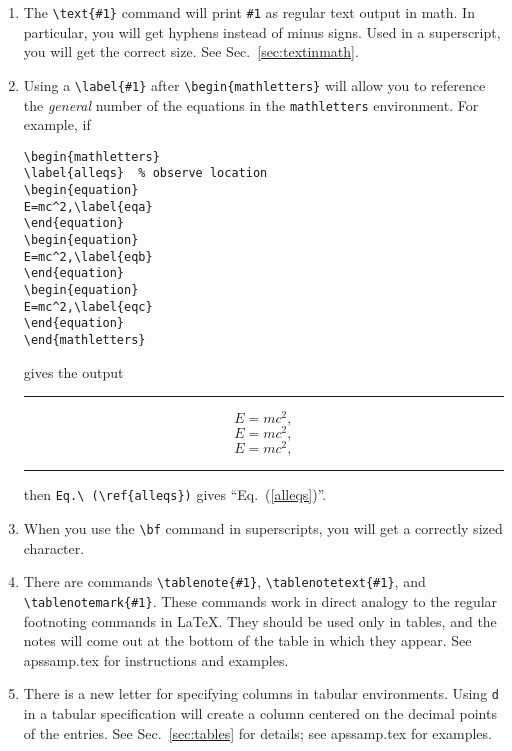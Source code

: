 \begin{enumerate}
\item The \verb+\text{#1}+ command will print \verb+#1+ as regular text
output in math. In particular, you will get hyphens instead of minus signs.
Used in a superscript, you will get the correct size. See Sec.\
\ref{sec:textinmath}.

\item Using a \verb+\label{#1}+ after \verb+\begin{mathletters}+ will allow
you to reference the {\em general\/} number of the equations in the
\verb+mathletters+ environment. For example, if
\begin{verbatim}
\begin{mathletters}
\label{alleqs}  % observe location
\begin{equation}
E=mc^2,\label{eqa}
\end{equation}
\begin{equation}
E=mc^2,\label{eqb}
\end{equation}
\begin{equation}
E=mc^2,\label{eqc}
\end{equation}
\end{mathletters}
\end{verbatim}
gives the output
\smallskip\hrule\smallskip
\begin{mathletters}
\label{alleqs}
\begin{equation}
E=mc^2,\label{eqa}
\end{equation}
\begin{equation}
E=mc^2,\label{eqb}
\end{equation}
\begin{equation}
E=mc^2,\label{eqc}
\end{equation}
\end{mathletters}
\smallskip\hrule\smallskip
then \verb+Eq.\ (\ref{alleqs})+ gives ``Eq.\ (\ref{alleqs})''.

\item When you use the \verb+\bf+ command in superscripts, you will get a
correctly sized character.

\item There are commands \verb+\tablenote{#1}+, \verb+\tablenotetext{#1}+,
and \verb+\tablenotemark{#1}+. These commands work in direct analogy to the
regular footnoting commands in \LaTeX{}. They should be used only in
tables, and the notes will come out at the bottom of the table in which
they appear. See apssamp.tex for instructions and examples.

\item There is a new letter for specifying columns in tabular environments.
Using \verb+d+ in a tabular specification will create a column centered on
the decimal points of the entries. See Sec.\ \ref{sec:tables} for details;
see apssamp.tex for examples.


\end{enumerate}
